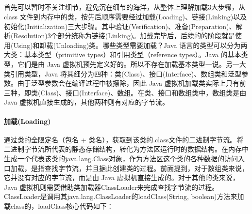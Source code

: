 \documentclass[../../../interview-questions.tex]{subfiles}
\begin{document}
\subsection{\color{red}{Java虚拟机如何加载类(Java类的生命周期)}}

首先可以暂时不关注细节，避免沉在细节的海洋，从整体上理解加载3大步骤，从 class 文件到内存中的类，按先后顺序需要经过加载(Loading)、链接(Linking)以及初始化(Initialization)三大步骤。其中验证(Verification)、准备(Preparation)、解析(Resolution)3个部分统称为链接(Linking)。加载完毕后，后续的的阶段就是使用(Using)和卸载(Unloading)类。哪些类型需要加载？Java 语言的类型可以分为两大类：基本类型（primitive types）和引用类型（reference types）。Java 的基本类型，它们是由 Java 虚拟机预先定义好的。所以不存在加载基本类型一说。另一大类引用类型，Java 将其细分为四种：类(Class)、接口(Interface)、数组类和泛型参数。由于泛型参数会在编译过程中被擦除，因此 Java 虚拟机加载类实际上只有前三种，即类(Class)、接口(Interface)、数组。在类、接口和数组类中，数组类是由 Java 虚拟机直接生成的，其他两种则有对应的字节流。

\paragraph{加载(Loading)}

通过类的全限定名（包名 + 类名），获取到该类的.class文件的二进制字节流。将二进制字节流所代表的静态存储结构，转化为方法区运行时的数据结构。在内存中生成一个代表该类的java.lang.Class对象，作为方法区这个类的各种数据的访问入口加载，是指查找字节流，并且据此创建类的过程。前面提到，对于数组类来说，它并没有对应的字节流，而是由 Java 虚拟机直接生成的。对于其他的类来说，Java 虚拟机则需要借助类加载器ClassLoader来完成查找字节流的过程。ClassLoader是调用其java.lang.ClassLoader的loadClass(String, boolean)方法来加载class的，loadClass核心代码如下：
\end{document}
